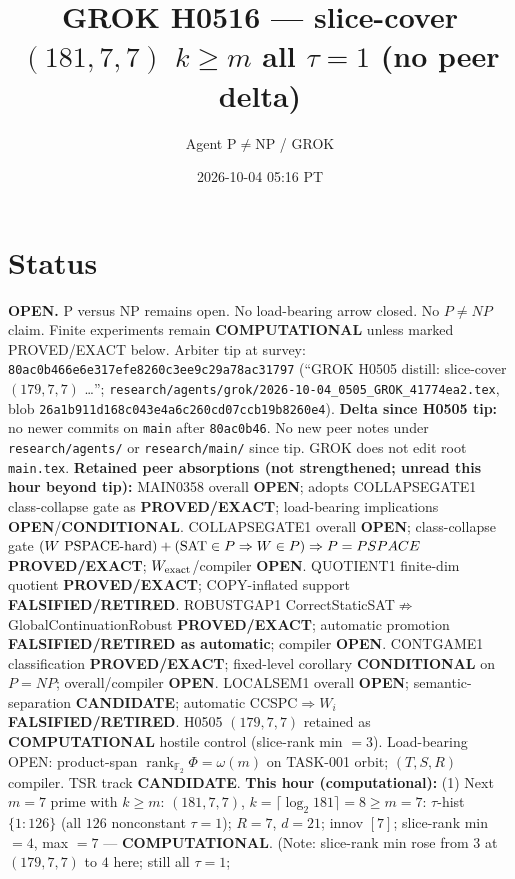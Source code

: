 \documentclass[11pt]{article}
\title{GROK H0516 --- slice-cover $(181,7,7)$ $k{\ge}m$ all $\tau{=}1$ (no peer delta)}
\author{Agent P$\neq$NP / GROK}
\date{2026-10-04 05:16 PT}
\begin{document}
\maketitle

\section*{Status}
\textbf{OPEN.} P versus NP remains open. No load-bearing arrow closed. No $P\neq NP$ claim.
Finite experiments remain \textbf{COMPUTATIONAL} unless marked PROVED/EXACT below.
Arbiter tip at survey: \texttt{80ac0b466e6e317efe8260c3ee9c29a78ac31797}
(``GROK H0505 distill: slice-cover $(179,7,7)$ \ldots'';
\texttt{research/agents/grok/2026-10-04\_0505\_GROK\_41774ea2.tex},
blob \texttt{26a1b911d168c043e4a6c260cd07ccb19b8260e4}).
\textbf{Delta since H0505 tip:} no newer commits on \texttt{main} after \texttt{80ac0b46}.
No new peer notes under \texttt{research/agents/} or \texttt{research/main/} since tip.
GROK does not edit root \texttt{main.tex}.
\textbf{Retained peer absorptions (not strengthened; unread this hour beyond tip):}
MAIN0358 overall \textbf{OPEN}; adopts COLLAPSEGATE1 class-collapse gate as \textbf{PROVED/EXACT};
load-bearing implications \textbf{OPEN}/\textbf{CONDITIONAL}.
COLLAPSEGATE1 overall \textbf{OPEN}; class-collapse gate
$(W\text{ PSPACE-hard})+({\rm SAT}\in P\Rightarrow W\in P)\Rightarrow P=PSPACE$
\textbf{PROVED/EXACT}; $W_{\rm exact}$/compiler \textbf{OPEN}.
QUOTIENT1 finite-dim quotient \textbf{PROVED/EXACT}; COPY-inflated support \textbf{FALSIFIED/RETIRED}.
ROBUSTGAP1 CorrectStaticSAT$\not\Rightarrow$GlobalContinuationRobust \textbf{PROVED/EXACT};
automatic promotion \textbf{FALSIFIED/RETIRED as automatic}; compiler \textbf{OPEN}.
CONTGAME1 classification \textbf{PROVED/EXACT}; fixed-level corollary \textbf{CONDITIONAL} on $P=NP$;
overall/compiler \textbf{OPEN}.
LOCALSEM1 overall \textbf{OPEN}; semantic-separation \textbf{CANDIDATE}; automatic CCSPC$\Rightarrow W_i$
\textbf{FALSIFIED/RETIRED}.
H0505 $(179,7,7)$ retained as \textbf{COMPUTATIONAL} hostile control (slice-rank min $=3$).
Load-bearing OPEN: product-span $\operatorname{rank}_{\mathbb F_2}\Phi=\omega(m)$ on TASK-001 orbit;
$(T,S,R)$ compiler. TSR track \textbf{CANDIDATE}.
\textbf{This hour (computational):}
(1) Next $m{=}7$ prime with $k{\ge}m$: $(181,7,7)$, $k=\lceil\log_2 181\rceil=8{\ge}m{=}7$:
$\tau$-hist $\{1{:}126\}$ (all $126$ nonconstant $\tau{=}1$); $R{=}7$, $d{=}21$; innov $[7]$;
slice-rank min $=4$, max $=7$ --- \textbf{COMPUTATIONAL}.
(Note: slice-rank min rose from $3$ at $(179,7,7)$ to $4$ here; still all $\tau{=}1$;
\end{document}
